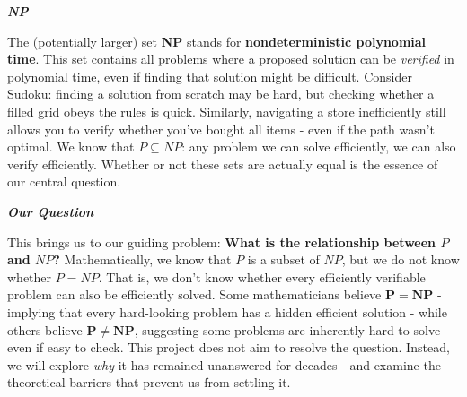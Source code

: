 \documentclass[12pt]{report}
\begin{document}
\begin{center}
    \vspace{0cm}
    {\Large\itshape \textbf{NP}\par}
\end{center}
The (potentially larger) set \textbf{NP} stands for \textbf{nondeterministic polynomial time}. This set contains all problems where a proposed solution can be \textit{verified} in polynomial time, even if finding that solution might be difficult.
Consider Sudoku: finding a solution from scratch may be hard, but checking whether a filled grid obeys the rules is quick. Similarly, navigating a store inefficiently still allows you to verify whether you've bought all items - even if the path wasn't optimal.
We know that $P \subseteq NP$: any problem we can solve efficiently, we can also verify efficiently. Whether or not these sets are actually equal is the essence of our central question.

\begin{center}
    \vspace{0cm}
    {\Large\itshape \textbf{Our Question}\par}
\end{center}

This brings us to our guiding problem: \textbf{What is the relationship between $P$ and $NP$?}
Mathematically, we know that $P$ is a subset of $NP$, but we do not know whether $P = NP$. That is, we don't know whether every efficiently verifiable problem can also be efficiently solved.
Some mathematicians believe $\mathbf{P = NP}$ - implying that every hard-looking problem has a hidden efficient solution - while others believe $\mathbf{P \neq NP}$, suggesting some problems are inherently hard to solve even if easy to check.
This project does not aim to resolve the question. Instead, we will explore \textit{why} it has remained unanswered for decades - and examine the theoretical barriers that prevent us from settling it.
\end{document}
